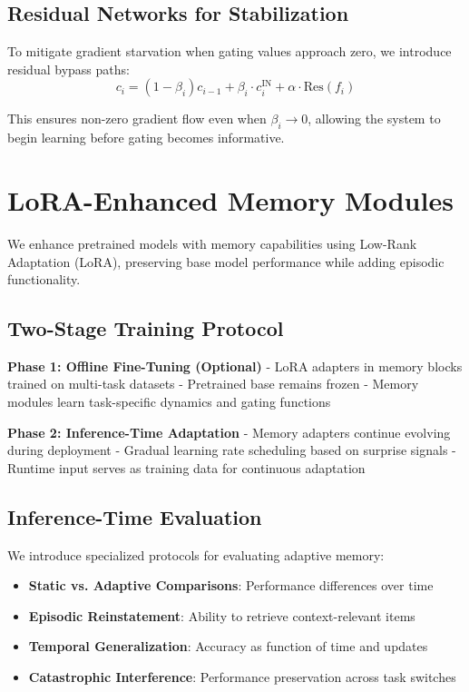 \documentclass[11pt]{article}
\begin{document}
\subsection{Residual Networks for Stabilization}

To mitigate gradient starvation when gating values approach zero, we introduce residual bypass paths:
\begin{equation}
c_i = (1 - \beta_i) c_{i-1} + \beta_i \cdot c^{\text{IN}}_i + \alpha \cdot \text{Res}(f_i)
\end{equation}

This ensures non-zero gradient flow even when $\beta_i \to 0$, allowing the system to begin learning before gating becomes informative.

\section{LoRA-Enhanced Memory Modules}

We enhance pretrained models with memory capabilities using Low-Rank Adaptation (LoRA), preserving base model performance while adding episodic functionality.

\subsection{Two-Stage Training Protocol}

\textbf{Phase 1: Offline Fine-Tuning (Optional)}
- LoRA adapters in memory blocks trained on multi-task datasets
- Pretrained base remains frozen
- Memory modules learn task-specific dynamics and gating functions

\textbf{Phase 2: Inference-Time Adaptation}
- Memory adapters continue evolving during deployment
- Gradual learning rate scheduling based on surprise signals
- Runtime input serves as training data for continuous adaptation

\subsection{Inference-Time Evaluation}

We introduce specialized protocols for evaluating adaptive memory:
\begin{itemize}
\item \textbf{Static vs. Adaptive Comparisons}: Performance differences over time
\item \textbf{Episodic Reinstatement}: Ability to retrieve context-relevant items
\item \textbf{Temporal Generalization}: Accuracy as function of time and updates
\item \textbf{Catastrophic Interference}: Performance preservation across task switches
\end{itemize}
\end{document}
